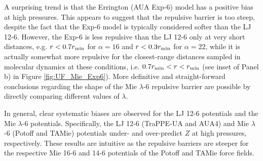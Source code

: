 \documentclass[preprint,letterpaper,floatfix,citeautoscript,aip,jcp]{revtex4-1}
\begin{document}
A surprising trend is that the Errington (AUA Exp-6) model has a positive bias at high pressures. This appears to suggest that the repulsive barrier is too steep, despite the fact that the Exp-6 model is typically considered softer than the LJ 12-6. However, the Exp-6 is less repulsive than the LJ 12-6 only at very short distances, e.g. $r < 0.7 r_{\rm min}$ for $\alpha = 16$ and $r < 0.3 r_{\rm min}$ for $\alpha = 22$, while it is actually somewhat more repulsive for the closest-range distances sampled in molecular dynamics at these conditions, i.e. $0.7 r_{\rm min} < r < r_{\rm min}$ (see inset of Panel b) in Figure \ref{fig:UF_Mie_Exp6}).  
%
More definitive and straight-forward conclusions regarding the shape of the Mie $\lambda$-6 repulsive barrier are possible by directly comparing different values of $\lambda$. 
 
In general, 
clear systematic biases are observed for the LJ 12-6 potentials and the Mie $\lambda$-6 potentials. Specifically, the LJ 12-6 (TraPPE-UA and AUA4) and Mie $\lambda$-6 (Potoff and TAMie) potentials under- and over-predict $Z$ at high pressures, respectively. These results are intuitive as the repulsive barriers are steeper for the respective Mie 16-6 and 14-6 potentials of the Potoff and TAMie force fields. 


\end{document}
